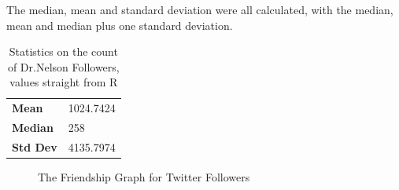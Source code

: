

\clearpage
The median, mean and standard deviation were all calculated, with the median, mean and median plus one standard deviation.
\vspace*{2mm}
\begin{table}
\centering
\begin{tabular}{ l l }
\hline
\textbf{Mean} & 1024.7424 \\
\textbf{Median} & 258 \\
\textbf{Std Dev} & 4135.7974\\
\hline
\end{tabular}
\caption{Statistics on the count of Dr.Nelson Followers, values straight from R}
\label{tab:q2stats}
\end{table}
\begin{figure}[h!]
\centering
{}
\caption{The Friendship Graph for Twitter Followers}
\label{fig:followers_graph}
\end{figure}


